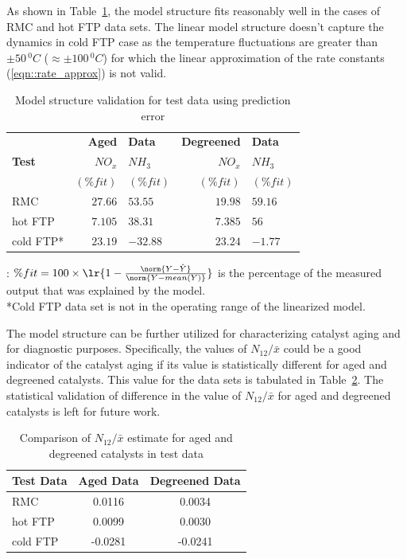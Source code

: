 As shown in Table~\ref{tab:pfit}, the model structure fits reasonably well
in the cases of RMC and hot FTP data sets. The linear model structure doesn't
capture the dynamics in cold FTP case as the temperature fluctuations are
greater than $\pm 50\, ^0 C$ ($\approx \pm 100\, ^0C$) for which the linear
approximation of the rate constants (\ref{eqn::rate_approx}) is not valid.


\begin{table}[h]
\caption{Model structure validation for test data using prediction error} \label{tab:pfit}
    \begin{center}
    \begin{tabular}{| l | r l | r l |}
        \hline
 & \textbf{Aged} & \textbf{Data} & \textbf{Degreened} & \textbf{Data}
\\
\textbf{Test} & $NO_x$    & $NH_3$    &  $NO_x$   & $NH_3$   \\
& $(\%fit)$ & $(\%fit)$ &  $(\%fit)$& $(\%fit)$\\ \hline
        RMC           & $27.66$ & $53.55$ & $19.98$ & $59.16$ \\ \hline
        hot FTP       & $7.105$ & $38.31$ & $7.385$ & $56$\\ \hline
        cold FTP*      & $23.19$ & $-32.88$& $23.24$ & $-1.77$\\ \hline
\end{tabular}
    \end{center}
: $\%fit = 100 \times \lr{1 - \frac{\norm{Y- \hat Y}}{\norm{Y -
mean(Y)}}}$ is the percentage of the measured output that was explained by the
model.\\
*Cold FTP data set is not in the operating range of the linearized model.
\end{table}


The model structure can be further utilized for characterizing catalyst aging
and for diagnostic purposes. Specifically, the values of $N_{12}/\bar x$ could
be a good indicator of the catalyst aging if its value is statistically
different for aged and degreened catalysts. This value for the data sets is
tabulated in Table~\ref{tab:N12_comp}. The statistical validation of
difference in the value of $N_{12}/\bar x$ for aged and degreened catalysts is left for future work.

\begin{table}[h]
\caption{Comparison of $N_{12}/\bar x$ estimate for aged and degreened
    catalysts in test data} \label{tab:N12_comp}
    \centering
    \begin{tabular}{|l|c|c|}
        \hline
        \textbf{Test Data} & \textbf{Aged Data} & \textbf{Degreened Data}\\ \hline
        RMC                & 0.0116        & 0.0034 \\ \hline
        hot FTP            & 0.0099        & 0.0030 \\ \hline
        cold FTP           & -0.0281       & -0.0241 \\ \hline
    \end{tabular}
\end{table}
